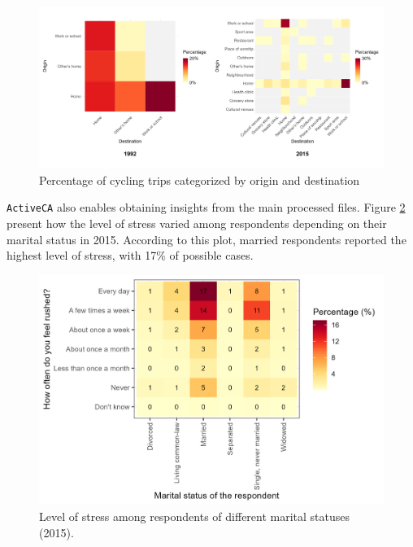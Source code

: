 \documentclass[Royal,times,sageh]{sagej}
\begin{document}
\begin{figure}

{\centering \includegraphics[width=1\linewidth]{Manuscript-figures/cycling_hm_fig} 

}

\caption{Percentage of cycling trips categorized by origin and destination}\label{fig:figure-02}
\end{figure}

\texttt{ActiveCA} also enables obtaining insights from the main
processed files. Figure \ref{fig:figure-stress} present how the level of
stress varied among respondents depending on their marital status in
2015. According to this plot, married respondents reported the highest
level of stress, with 17\% of possible cases.

\begin{figure}

{\centering \includegraphics[width=1\linewidth]{Manuscript-figures/main_stress_figure} 

}

\caption{Level of stress among respondents of different marital statuses (2015).}\label{fig:figure-stress}
\end{figure}
\end{document}
